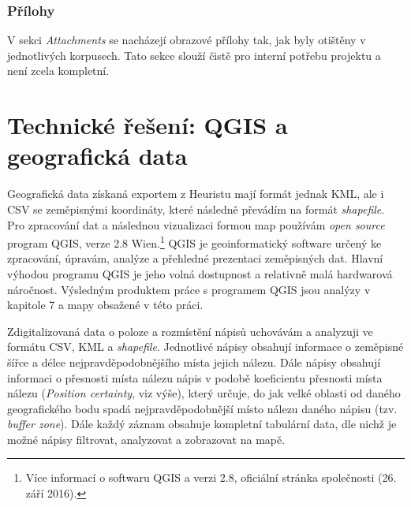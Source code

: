 \subsubsection[přílohy]{Přílohy}

V sekci {\em Attachments} se nacházejí obrazové přílohy tak, jak byly otištěny v jednotlivých korpusech. Tato sekce slouží čistě pro interní potřebu projektu a není zcela kompletní.

\section[technické-řešení-qgis-a-geografická-data]{Technické řešení: QGIS a geografická data}

Geografická data získaná exportem z Heuristu mají formát jednak KML, ale i CSV se zeměpisnými koordináty, které následně převádím na formát {\em shapefile}. Pro zpracování dat a následnou vizualizaci formou map používám {\em open source} program QGIS, verze 2.8 Wien.\footnote{Více informací o softwaru QGIS a verzi 2.8, oficiální stránka společnosti \from[url8] (26. září 2016).} QGIS je geoinformatický software určený ke zpracování, úpravám, analýze a přehledné prezentaci zeměpisných dat. Hlavní výhodou programu QGIS je jeho volná dostupnost a relativně malá hardwarová náročnost. Výsledným produktem práce s programem QGIS jsou analýzy v kapitole 7 a mapy obsažené v této práci.

Zdigitalizovaná data o poloze a rozmístění nápisů uchovávám a analyzuji ve formátu CSV, KML a {\em shapefile}. Jednotlivé nápisy obsahují informace o zeměpisné šířce a délce nejpravděpodobnějšího místa jejich nálezu. Dále nápisy obsahují informaci o přesnosti místa nálezu nápis v podobě koeficientu přesnosti místa nálezu ({\em Position certainty}, viz výše), který určuje, do jak velké oblasti od daného geografického bodu spadá nejpravděpodobnější místo nálezu daného nápisu (tzv. {\em buffer zone}). Dále každý záznam obsahuje kompletní tabulární data, dle nichž je možné nápisy filtrovat, analyzovat a zobrazovat na mapě.

